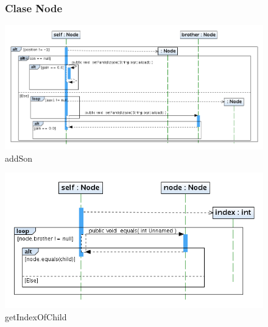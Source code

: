 \begin{figure}
\subsubsection{Clase Node}
\centering
\includegraphics[width=1.2\textwidth]{imgsSecuencia/Node/addSon.png}
\caption{addSon}
\end{figure}
\newpage
\begin{figure}
\centering
\includegraphics[width=1\textwidth]{imgsSecuencia/Node/getIndexOfChild.png}
\caption{getIndexOfChild}
\end{figure}
\newpage
% 
% 
